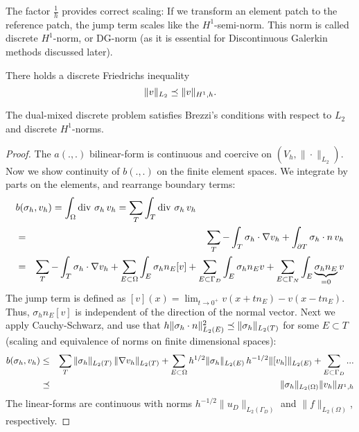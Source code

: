 The factor $\tfrac{1}{h}$ provides correct scaling: If we transform an
element patch to the reference patch, the jump term scales like the $H^1$-semi-norm. 
This norm is called discrete $H^1$-norm, or DG-norm (as it is essential for Discontinuous Galerkin methods discussed later).

There holds a discrete Friedrichs inequality
$$
\| v \|_{L_2} \preceq \| v \|_{H^1,h}.
$$

\medskip

\begin{theorem} \label{theo_mixeddiscretenorms}
The dual-mixed discrete problem satisfies Brezzi's conditions with respect to $L_2$ and discrete $H^1$-norms.
\end{theorem}
\begin{proof} The $a(.,.)$ bilinear-form is continuous and coercive on $(V_h, \| \cdot \|_{L_2})$. 
Now we show continuity of $b(.,.)$ on the finite element spaces. We integrate by parts on the elements, and rearrange boundary terms:
\begin{eqnarray*}
\lefteqn{b(\sigma_h, v_h) = \int_\Omega \opdiv \, \sigma_h \, v_h = \sum_T \int_T \opdiv \, \sigma_h \, v_h} \\
& = & \sum_T -\int_T \sigma_h \cdot \nabla v_h + \int_{\partial T} \sigma_h \cdot n \, v_h \\
& = & \sum_T - \int_T \sigma_h \cdot \nabla v_h + \sum_{E \subset \Omega} \int_E \sigma_h n_E [v] + \sum_{E \subset \Gamma_D} \int_E \sigma_h n_E v  + \sum_{E \subset \Gamma_N} \int_E \underbrace{\sigma_h n_E}_{=0} v 
\end{eqnarray*}
The jump term is defined as $[v](x) = \lim_{t \rightarrow 0^+} v(x+t
n_E) - v(x-t n_E)$. Thus, $\sigma_h n_E [v]$ is independent of
the direction of the normal vector.
Next we apply Cauchy-Schwarz, and use that $h \| \sigma_h \cdot n \|_{L_2(E)}^2 \preceq \| \sigma_h \|_{L_2(T)}$ for some $E \subset T$ (scaling and equivalence of norms on finite dimensional spaces):
\begin{eqnarray*}
b(\sigma_h, v_h) & \leq & \sum_T \| \sigma_h \|_{L_2(T)} \, \| \nabla v_h \|_{L_2(T)}  + \sum_{E \subset \Omega}  h^{1/2} \| \sigma_h \|_{L_2(E)} \, h^{-1/2} \| [v_h]\|_{L_2(E)}   + \sum_{E \subset \Gamma_D} ...  \\
& \preceq &  \| \sigma_h \|_{L_2(\Omega)}  \|  v_h \|_{H^1,h}
\end{eqnarray*}
The linear-forms are continuous with norms $h^{-1/2} \| u_D \|_{L_2(\Gamma_D)}$ and $\| f \|_{L_2(\Omega)}$, respectively.


\end{proof}
